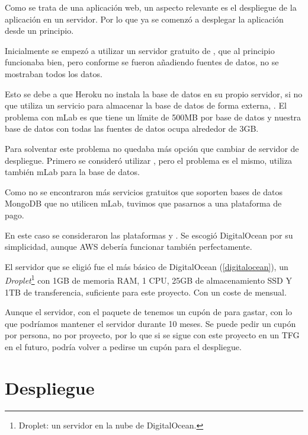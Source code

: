 Como se trata de una aplicación web, un aspecto relevante es el despliegue de la aplicación en un servidor. Por lo que ya se comenzó a desplegar la aplicación desde un principio.

Inicialmente se empezó a utilizar un servidor gratuito de , que al principio funcionaba bien, pero conforme se fueron añadiendo fuentes de datos, no se mostraban todos los datos.

Esto se debe a que Heroku no instala la base de datos en su propio servidor, si no que utiliza un servicio para almacenar la base de datos de forma externa, . El problema con mLab es que tiene un límite de 500MB por base de datos y nuestra base de datos con todas las fuentes de datos ocupa alrededor de 3GB.

Para solventar este problema no quedaba más opción que cambiar de servidor de despliegue. Primero se consideró utilizar , pero el problema es el mismo, utiliza también mLab para la base de datos.

Como no se encontraron más servicios gratuitos que soporten bases de datos MongoDB que no utilicen mLab, tuvimos que pasarnos a una plataforma de pago.

En este caso se consideraron las plataformas  y . Se escogió DigitalOcean por su simplicidad, aunque AWS debería funcionar también perfectamente.

El servidor que se eligió fue el más básico de DigitalOcean (\ref{digitalocean}), un \textit{Droplet}\footnote{Droplet: un servidor en la nube de DigitalOcean.} con 1GB de memoria RAM, 1 CPU, 25GB de almacenamiento SSD Y 1TB de transferencia, suficiente para este proyecto. Con un coste de  mensual.

Aunque el servidor, con el paquete de  tenemos un cupón de  para gastar, con lo que podríamos mantener el servidor durante 10 meses. Se puede pedir un cupón por persona, no por proyecto, por lo que si se sigue con este proyecto en un TFG en el futuro, podría volver a pedirse un cupón para el despliegue.

\section{Despliegue}

